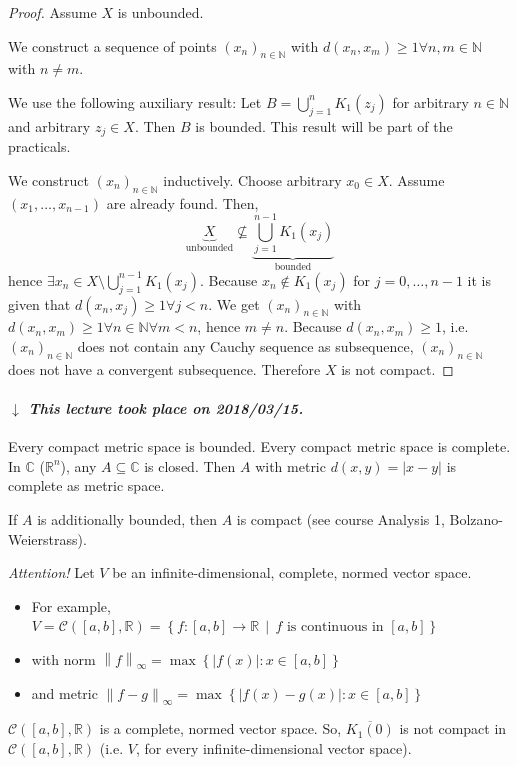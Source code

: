 \documentclass{article}
\newcommand{\set}[1]{\left\{#1\right\}}
\newcommand{\setdef}[2]{\left\{\left.#1\,\middle|\,#2\right.\right\}}
\newcommand{\norm}[1]{\left\|#1\right\|}
\newcommand{\card}[1]{\left|#1\right|}
\newcommand{\dateref}[1]{%
  \begin{mdframed}[backgroundcolor=gray!10,innerbottommargin=0pt,innertopmargin=0pt]
    \paragraph{\textit{$\downarrow$ This lecture took place on #1.}}%
  \end{mdframed}%
}
\begin{document}
\begin{proof}
  Assume $X$ is unbounded.

  We construct a sequence of points $(x_n)_{n \in \mathbb N}$ with $d(x_n, x_m) \geq 1 \forall n,m \in \mathbb N$ with $n \neq m$.

  We use the following auxiliary result: Let $B = \bigcup_{j=1}^n K_1(z_j)$ for arbitrary $n \in \mathbb N$ and arbitrary $z_j \in X$. Then $B$ is bounded. This result will be part of the practicals.

  We construct $(x_n)_{n\in\mathbb N}$ inductively. Choose arbitrary $x_0 \in X$. Assume $(x_1, \dots, x_{n-1})$ are already found. Then,
  \[ \underbrace{X}_{\text{unbounded}} \not\subseteq \underbrace{\bigcup_{j=1}^{n-1} K_1(x_j)}_{\text{bounded}} \]
  hence $\exists x_n \in X \setminus \bigcup_{j=1}^{n-1} K_1(x_j)$.
  Because $x_n \not\in K_1(x_j)$ for $j = 0, \dots, n-1$ it is given that $d(x_n, x_j) \geq 1 \forall j < n$. We get $(x_n)_{n \in \mathbb N}$ with $d(x_n, x_m) \geq 1 \forall n \in \mathbb N \forall m < n$, hence $m \neq n$. Because $d(x_n, x_m) \geq 1$, i.e. $(x_n)_{n \in \mathbb N}$ does not contain any Cauchy sequence as subsequence, $(x_n)_{n \in \mathbb N}$ does not have a convergent subsequence. Therefore $X$ is not compact.
\end{proof}

\dateref{2018/03/15}

Every compact metric space is bounded. Every compact metric space is complete.
In $\mathbb C$ ($\mathbb R^n$), any $A \subseteq \mathbb C$ is closed.
Then $A$ with metric $d(x,y) = \card{x - y}$ is complete as metric space.

If $A$ is additionally bounded, then $A$ is compact (see course Analysis 1, Bolzano-Weierstrass).

\emph{Attention!} Let $V$ be an infinite-dimensional, complete, normed vector space.
\begin{itemize}
  \item For example, $V = \mathcal C([a,b], \mathbb R) = \setdef{f: [a,b] \to \mathbb R}{f \text{ is continuous in } [a,b]}$
  \item with norm $\norm{f}_{\infty} = \max\set{\card{f(x)}: x \in [a,b]}$
  \item and metric $\norm{f - g}_{\infty} = \max\set{\card{f(x) - g(x)}: x \in [a,b]}$
\end{itemize}
$\mathcal C([a,b], \mathbb R)$ is a complete, normed vector space.
So, $\overline{K_1(0)}$ is not compact in $\mathcal C([a,b], \mathbb R)$ (i.e. $V$, for every infinite-dimensional vector space).
\end{document}
